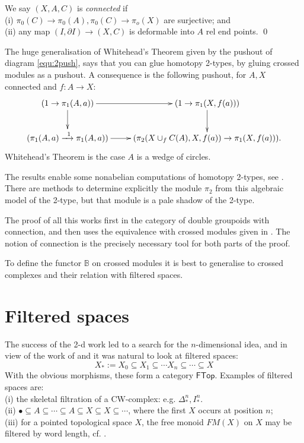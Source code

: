 \documentclass{elsarticle}
\def\FTop{\mathsf{FTop}}
\def\B{\beta}
\def\B{\beta}
\def\B{\mathbb B}
\begin{document}
\begin{Def}\label{def:connpair} We say $(X, A, C)$  is  \emph{connected} if \\
(i) $\pi_0(C) \to \pi_0(A), \pi_0(C) \to \pi_o(X) $ are surjective; and \\
(ii) any map $(I, \partial I) \to (X, C)$ is deformable into $A$ rel end points. \qed
\end{Def}

The huge generalisation of Whitehead's Theorem given by the pushout of diagram \eqref{equ:2push}, says that you can glue homotopy 2-types, by
gluing crossed modules as a pushout.
 A consequence is the following pushout, for $A,X$  connected and $f: A \to X$:
\begin{equation}
\vcenter{\xymatrix{\ar [r] \ar [d]   (1 \to \pi_1(A,a)) & \ar [d] (1 \to \pi_1(X,f(a)))\\
\ar [r] (\pi_1(A,a) \xrightarrow{\;\; 1} \pi_1(A,a)) & (\pi_2(X \cup_f C(A),X,f(a))  \to \pi_1(X,f(a)) ) .   }  }
\end{equation}
Whitehead's Theorem is the case $A$ is a wedge of circles.

The results enable some nonabelian computations of homotopy 2-types, see \cite[Chapters 4,5]{BHS}.  There are methods to determine explicitly the module $\pi_2$  from this algebraic
model of the 2-type, but that module is a pale shadow of the 2-type.

The proof of all this works first in the category of double groupoids with connection, and then uses the equivalence with crossed modules given in \cite{BS76}.  The notion of connection is the precisely  necessary tool   for both parts of the proof.


To define the functor $\B$ on crossed modules it is best to generalise to crossed complexes and their relation with filtered spaces.
\section{Filtered spaces}\label{sec:fltsp}
The success of the 2-d work  led to a search for the $n$-dimensional idea, and in view of the work of \cite{Bl48} and \cite{W49CHII} it  was natural to look at filtered spaces:
\begin{equation}
  X_* := X_0 \subseteq X_1 \subseteq \cdots X_n \subseteq \cdots  \subseteq  X
\end{equation}
With the obvious morphisms, these form a category $\FTop$.  Examples of filtered spaces are:\\
(i) the skeletal filtration of a CW-complex: e.g. $\Delta^n_*, I^n_*$. \\
(ii) $\bullet \subseteq A \subseteq \cdots \subseteq A \subseteq X \subseteq X \subseteq \cdots $,
where the first $X$ occurs at position $n$;\\
(iii)  for a pointed topological space $X$,  the free monoid $F M(X)$ on $X$ may be filtered by word length, cf. \cite{Ba-B}.
\end{document}
